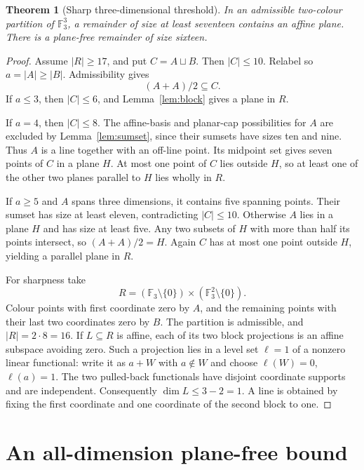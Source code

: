\documentclass[11pt]{article}
\newtheorem{theorem}{Theorem}[section]
\theoremstyle{remark}\newtheorem{remark}[theorem]{Remark}
\newcommand{\F}{\mathbb F_3}
\begin{document}
\begin{theorem}[Sharp three-dimensional threshold]\label{thm:three}
In an admissible two-colour partition of $\F^3$, a remainder of size at
least seventeen contains an affine plane. There is a plane-free remainder
of size sixteen.
\end{theorem}
\begin{proof}
Assume $|R|\geq17$, and put $C=A\sqcup B$. Then $|C|\leq10$. Relabel so
$a=|A|\geq|B|$. Admissibility gives
\[
 (A+A)/2\subseteq C.
\]
If $a\leq3$, then $|C|\leq6$, and Lemma~\ref{lem:block} gives a plane in $R$.

If $a=4$, then $|C|\leq8$. The affine-basis and planar-cap possibilities for
$A$ are excluded by Lemma~\ref{lem:sumset}, since their sumsets have sizes
ten and nine. Thus $A$ is a line together with an off-line point. Its
midpoint set gives seven points of $C$ in a plane $H$. At most one point
of $C$ lies outside $H$, so at least one of the other two planes parallel
to $H$ lies wholly in $R$.

If $a\geq5$ and $A$ spans three dimensions, it contains five spanning
points. Their sumset has size at least eleven, contradicting $|C|\leq10$.
Otherwise $A$ lies in a plane $H$ and has size at least five. Any two subsets
of $H$ with more than half its points intersect, so $(A+A)/2=H$.
Again $C$ has at most one point outside $H$, yielding a parallel plane in $R$.

For sharpness take
\[
 R=(\F\setminus\{0\})\times(\F^2\setminus\{0\}).
\]
Colour points with first coordinate zero by $A$, and the remaining points
with their last two coordinates zero by $B$. The partition is admissible,
and $|R|=2\cdot8=16$. If $L\subseteq R$ is affine, each of its two block
projections is an affine subspace avoiding zero. Such a projection lies in
a level set $\ell=1$ of a nonzero linear functional: write it as $a+W$
with $a\notin W$ and choose $\ell(W)=0$, $\ell(a)=1$. The two pulled-back
functionals have disjoint coordinate supports and are independent.
Consequently $\dim L\leq3-2=1$. A line is obtained by fixing the first
coordinate and one coordinate of the second block to one.
\end{proof}

\section{An all-dimension plane-free bound}
\end{document}
